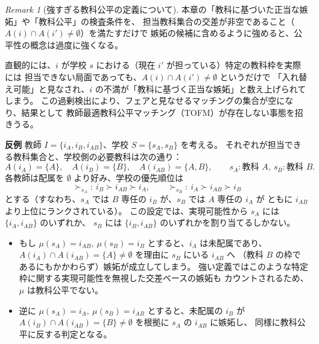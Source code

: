 \documentclass[12pt, a4paper]{article}
\theoremstyle{definition}
\theoremstyle{remark}
\newtheorem{remark}{Remark}
\theoremstyle{plain}
\begin{document}
\bigbreak


\begin{remark}[強すぎる教科公平の定義について]
本章の「教科に基づいた正当な嫉妬」や「教科公平」の検査条件を、
担当教科集合の交差が非空であること（$A(i)\cap A(i')\neq\emptyset$）を満たすだけで
嫉妬の候補に含めるように強めると、公平性の概念は過度に強くなる。

直観的には、$i$ が学校 $s$ における（現在 $i'$ が担っている）特定の教科枠を実際には
担当できない局面であっても、$A(i)\cap A(i')\neq\emptyset$ というだけで
「入れ替え可能」と見なされ、$i$ の不満が「教科に基づく正当な嫉妬」と数え上げられてしまう。
この過剰検出により、フェアと見なせるマッチングの集合が空になり、結果として
教師最適教科公平マッチング（TOFM）が存在しない事態を招きうる。

\medskip
\noindent\textbf{反例}
教師 $I=\{i_A,i_B,i_{AB}\}$、学校 $S=\{s_A,s_B\}$ を考える。
それぞれが担当できる教科集合と、学校側の必要教科は次の通り：
\[
A(i_A)=\{A\},\quad A(i_B)=\{B\},\quad A(i_{AB})=\{A,B\},\qquad
s_A:\text{教科 }A,\ s_B:\text{教科 }B.
\]
各教師は配属を $\emptyset$ より好み、学校の優先順位は
\[
\succ_{s_A}:\ i_B \succ i_{AB} \succ i_A,\qquad
\succ_{s_B}:\ i_A \succ i_{AB} \succ i_B
\]
とする（すなわち、$s_A$ では $B$ 専任の $i_B$ が、$s_B$ では $A$ 専任の $i_A$ が
ともに $i_{AB}$ より上位にランクされている）。
この設定では、実現可能性から $s_A$ には $\{i_A,i_{AB}\}$ のいずれか、
$s_B$ には $\{i_B,i_{AB}\}$ のいずれかを割り当てるしかない。

\begin{itemize}
\item もし $\mu(s_A)=i_{AB},\ \mu(s_B)=i_B$ とすると、$i_A$ は未配属であり、
$A(i_A)\cap A(i_{AB})=\{A\}\neq\emptyset$ を理由に $s_B$ にいる $i_{AB}$ へ
（教科 $B$ の枠であるにもかかわらず）嫉妬が成立してしまう。
強い定義ではこのような特定枠に関する実現可能性を無視した交差ベースの嫉妬も
カウントされるため、$\mu$ は教科公平でない。

\item 逆に $\mu(s_A)=i_A,\ \mu(s_B)=i_{AB}$ とすると、未配属の $i_B$ が
$A(i_B)\cap A(i_{AB})=\{B\}\neq\emptyset$ を根拠に $s_A$ の $i_{AB}$ に嫉妬し、
同様に教科公平に反する判定となる。
\end{itemize}


\end{remark}
\end{document}
